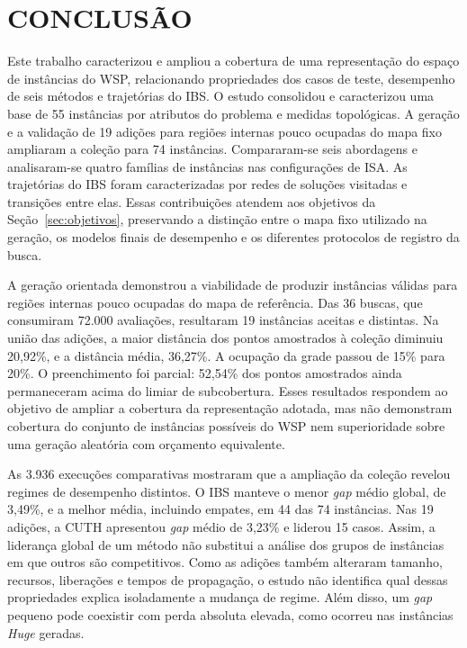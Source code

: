 \chapter{\MakeUppercase{Conclusão}}\label{sec:conclusao}

Este trabalho caracterizou e ampliou a cobertura de uma representação do
espaço de instâncias do WSP, relacionando propriedades dos casos de teste,
desempenho de seis métodos e trajetórias do IBS. O estudo consolidou e
caracterizou uma base de 55 instâncias por atributos do problema e medidas
topológicas. A geração e a validação de 19 adições para regiões internas
pouco ocupadas do mapa fixo ampliaram a coleção para 74 instâncias.
Compararam-se seis abordagens e analisaram-se quatro famílias de instâncias
nas configurações de ISA. As trajetórias do IBS foram caracterizadas por
redes de soluções visitadas e transições entre elas. Essas contribuições
atendem aos objetivos da Seção~\ref{sec:objetivos}, preservando a distinção
entre o mapa fixo utilizado na geração, os modelos finais de desempenho
e os diferentes protocolos de registro da busca.

A geração orientada demonstrou a viabilidade de produzir instâncias
válidas para regiões internas pouco ocupadas do mapa de referência.
Das 36 buscas, que consumiram 72.000 avaliações, resultaram 19 instâncias
aceitas e distintas. Na união das adições, a maior distância dos pontos
amostrados à coleção diminuiu 20,92\%, e a distância média, 36,27\%.
A ocupação da grade passou de 15\% para 20\%. O preenchimento foi parcial:
52,54\% dos pontos amostrados ainda permaneceram acima do limiar de
subcobertura. Esses resultados respondem ao objetivo de ampliar a cobertura
da representação adotada, mas não demonstram cobertura do conjunto de
instâncias possíveis do WSP nem superioridade sobre uma geração aleatória
com orçamento equivalente.

As 3.936 execuções comparativas mostraram que a ampliação da coleção
revelou regimes de desempenho distintos. O IBS manteve o menor
\textit{gap} médio global, de 3,49\%, e a melhor média, incluindo empates,
em 44 das 74 instâncias. Nas 19 adições, a CUTH apresentou
\textit{gap} médio de 3,23\% e liderou 15 casos. Assim, a liderança global
de um método não substitui a análise dos grupos de instâncias em que
outros são competitivos. Como as adições também alteraram tamanho,
recursos, liberações e tempos de propagação, o estudo não identifica
qual dessas propriedades explica isoladamente a mudança de regime.
Além disso, um \textit{gap} pequeno pode coexistir com perda absoluta
elevada, como ocorreu nas instâncias \textit{Huge} geradas.

